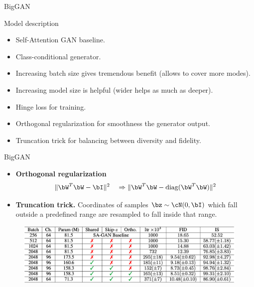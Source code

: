 \begin{frame}{BigGAN}
	\begin{block}{Model description}
		\begin{itemize}
			\item Self-Attention GAN baseline.
			\item Class-conditional generator.
			\item Increasing batch size gives tremendous benefit (allows to cover more modes).
			\item Increasing model size is helpful (wider helps as much as deeper).
			\item Hinge loss for training.
			\item Orthogonal regularization for smoothness the generator output.
			\item Truncation trick for balancing between diversity and fidelity.
		\end{itemize}
	\end{block}
	\vspace{0.5cm}

\end{frame}
\begin{frame}{BigGAN}
	\begin{itemize}
		\item \textbf{Orthogonal regularization}
		\[
		\| \bW^T \bW - \bI \|^2 \quad \Rightarrow \| \bW^T \bW - \text{diag}(\bW^T \bW) \|^2
		\]
		\item \textbf{Truncation trick.} Coordinates of samples $\bz \sim \cN(0, \bI)$ which fall outside a predefined range are resampled to fall inside that range.
	\end{itemize}
	\begin{figure}
		\centering
		\includegraphics[width=\linewidth]{figs/biggan_results}
	\end{figure}
	
\end{frame}
